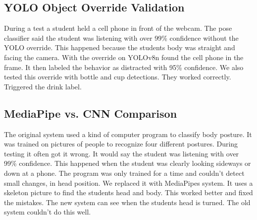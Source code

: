 \documentclass[conference]{IEEEtran}
\begin{document}
\subsection{YOLO Object Override Validation}
During a test a student held a cell phone in front of the webcam. The pose classifier said the student was listening with over 99\% confidence without the YOLO override. This happened because the students body was straight and facing the camera. With the override on YOLOv8n found the cell phone in the frame. It then labeled the behavior as distracted with 95\% confidence. We also tested this override with bottle and cup detections. They worked correctly. Triggered the drink label.

\subsection{MediaPipe vs. CNN Comparison} The original system used a kind of computer program to classify body posture. It was trained on pictures of people to recognize four different postures. During testing it often got it wrong. It would say the student was listening with over 99\% confidence. This happened when the student was clearly looking sideways or down at a phone. The program was only trained for a time and couldn't detect small changes, in head position. We replaced it with MediaPipes system. It uses a skeleton picture to find the students head and body. This worked better and fixed the mistakes. The new system can see when the students head is turned. The old system couldn't do this well.
\end{document}
